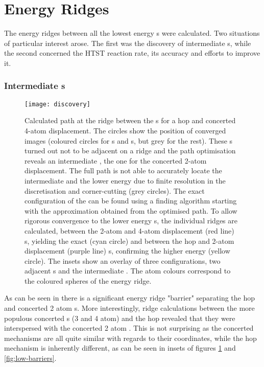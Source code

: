\section{Energy Ridges}
\label{al-energy-ridges}
The energy ridges between all the lowest energy s were calculated.
Two situations of particular interest arose.
The first was the discovery of intermediate s, while the second concerned the HTST reaction rate, its accuracy and efforts to improve it.

\subsubsection{Intermediate s}
\begin{figure}[hp]
\begin{center}
\texttt{[image: discovery]}
    \parbox{0.85\linewidth}{
\caption{
Calculated path at the ridge between the s for a hop and concerted 4-atom displacement.
The circles show the position of converged images (coloured circles for s and s, but grey for the rest). 
These s turned out not to be adjacent on a ridge and the path optimisation reveals an intermediate , the one for the concerted 2-atom displacement.
The full path is not able to accurately locate the intermediate  and the lower energy  due to finite resolution in the discretisation and corner-cutting (grey circles).
The exact configuration of the  can be found using a  finding algorithm starting with the approximation obtained from the optimised path.
To allow rigorous convergence to the lower energy s, the individual ridges are calculated, between the 2-atom and 4-atom displacement (red line) s, yielding the exact  (cyan circle) and between the hop and 2-atom displacement (purple line) s, confirming the higher energy  (yellow circle).
The insets show an overlay of three configurations, two adjacent s and the intermediate .
The atom colours correspond to the coloured spheres of the energy ridge.
}
\label{fig:discovery}
}
\end{center}
\end{figure}

As can be seen in  there is a significant energy ridge "barrier" separating the hop and concerted 2 atom s.
More interestingly, ridge calculations between the more populous concerted s (3 and 4 atom) and the hop revealed that they were interspersed with the concerted 2 atom .
This is not surprising as the concerted mechanisms are all quite similar with regards to their coordinates, while the hop mechanism is inherently different, as can be seen in insets of figures \ref{fig:discovery} and \ref{fig:low-barriers}.

